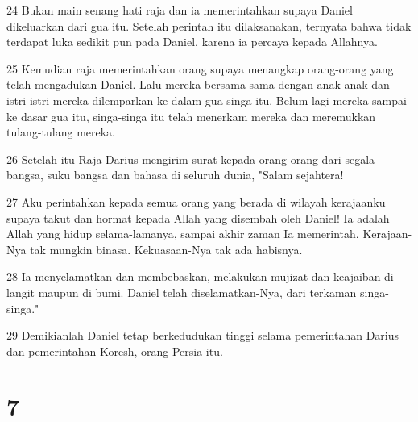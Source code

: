 \par 24 Bukan main senang hati raja dan ia memerintahkan supaya Daniel dikeluarkan dari gua itu. Setelah perintah itu dilaksanakan, ternyata bahwa tidak terdapat luka sedikit pun pada Daniel, karena ia percaya kepada Allahnya.
\par 25 Kemudian raja memerintahkan orang supaya menangkap orang-orang yang telah mengadukan Daniel. Lalu mereka bersama-sama dengan anak-anak dan istri-istri mereka dilemparkan ke dalam gua singa itu. Belum lagi mereka sampai ke dasar gua itu, singa-singa itu telah menerkam mereka dan meremukkan tulang-tulang mereka.
\par 26 Setelah itu Raja Darius mengirim surat kepada orang-orang dari segala bangsa, suku bangsa dan bahasa di seluruh dunia, "Salam sejahtera!
\par 27 Aku perintahkan kepada semua orang yang berada di wilayah kerajaanku supaya takut dan hormat kepada Allah yang disembah oleh Daniel! Ia adalah Allah yang hidup selama-lamanya, sampai akhir zaman Ia memerintah. Kerajaan-Nya tak mungkin binasa. Kekuasaan-Nya tak ada habisnya.
\par 28 Ia menyelamatkan dan membebaskan, melakukan mujizat dan keajaiban di langit maupun di bumi. Daniel telah diselamatkan-Nya, dari terkaman singa-singa."
\par 29 Demikianlah Daniel tetap berkedudukan tinggi selama pemerintahan Darius dan pemerintahan Koresh, orang Persia itu.

\chapter{7}

